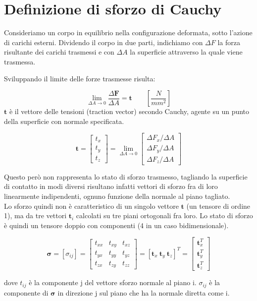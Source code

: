 \section{Definizione di sforzo di Cauchy}

Consideriamo un corpo in equilibrio nella configurazione deformata, sotto l'azione di carichi esterni. Dividendo il corpo in due parti, indichiamo con $\Delta F$ la forza risultante dei carichi trasmessi e con $\Delta A $ la superficie attraverso la quale viene trasmessa. 


Sviluppando il limite delle forze trasmesse risulta:

\begin{equation*}
 \lim_{\Delta A \to 0} \frac{\Delta \mathbf{F}}{\Delta A}   =\mathbf{t}             \quad\quad \left[ \frac{N}{mm^2} \right]
\end{equation*}
 $\mathbf{t}$ è il vettore delle tensioni (traction vector) secondo Cauchy, agente su un punto della superficie con normale specificata.

\begin{equation*}
\mathbf{t} = 
\begin{bmatrix}
t_x \\
t_y \\
t_z
\end{bmatrix}
=
\lim_{\Delta A \to 0} 
\begin{bmatrix}
\Delta F_x / \Delta A \\
\Delta F_y / \Delta A \\
\Delta F_z / \Delta A
\end{bmatrix}
\end{equation*}

Questo però non rappresenta lo stato di sforzo trasmesso, tagliando la superficie di contatto in modi diversi risultano infatti vettori di sforzo fra di loro linearmente indipendenti, ognuno funzione della normale al piano tagliato.\\
Lo sforzo quindi non è caratteristico di un singolo vettore $\mathbf{t}$ (un tensore di ordine 1),  ma da tre vettori $\mathbf{t}_i$ calcolati su tre piani ortogonali fra loro.
Lo stato di sforzo è quindi un tensore doppio con componenti (4 in un caso bidimensionale).


\begin{equation*}
\boldsymbol{\sigma} 
= \left[ \sigma_{ij} \right] 
= \begin{bmatrix}
t_{xx} & t_{xy} & t_{xz} \\
t_{yx} & t_{yy} & t_{yz} \\
t_{zx} & t_{zy} & t_{zz}
\end{bmatrix}
= \left[ 
\mathbf{t}_x \ \mathbf{t}_y \ \mathbf{t}_z
\right]^T
=\begin{bmatrix}
\mathbf{t}_x^T \\
\mathbf{t}_y^T \\
\mathbf{t}_z^T
\end{bmatrix}
\end{equation*}

dove $t_{ij}$ è la componente j del vettore sforzo normale al piano i.
$\sigma_{ij}$ è la componente di $\boldsymbol{\sigma}$ in direzione j sul piano che ha la normale diretta come i.

